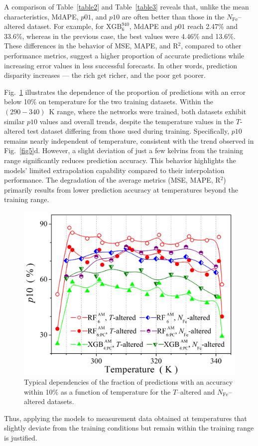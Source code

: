 \documentclass[a4paper,fleqn,draft]{cas-sc}
\begin{document}
A comparison of Table~\ref{table2} and Table~\ref{table3} reveals that,
unlike the mean characteristics, MdAPE, $p01$, and $p10$ are often better than those in the $N_\mathrm{Fe}$--altered dataset.
For example, for $\mathrm{XGB}^{940}_{6}$, MdAPE and $p01$ reach 2.47\% and 33.6\%,
whereas in the previous case, the best values were 4.46\% and 13.6\%.
These differences in the behavior of MSE, MAPE, and R$^2$, compared to other performance metrics,
suggest a higher proportion of accurate predictions while increasing error values in less successful forecasts.
In other words, prediction disparity increases ---
the rich get richer, and the poor get poorer.

Fig.~\ref{fig10} illustrates the dependence of the proportion of predictions with an error below 10\% on temperature for the two training datasets.
Within the $(290-340)$~K range, where the networks were trained, both datasets exhibit similar $p10$ values and overall trends,
despite the temperature values in the $T$-altered test dataset differing from those used during training.
Specifically, $p10$ remains nearly independent of temperature, consistent with the trend observed in Fig.~\ref{fig5}d.
However, a slight deviation of just a few kelvins from the training range significantly reduces prediction accuracy.
This behavior highlights the models' limited extrapolation capability compared to their interpolation performance.
The degradation of the average metrics (MSE, MAPE, R$^2$) primarily results from lower prediction accuracy at temperatures beyond the training range.

\begin{figure}
  \centering
     \includegraphics[width=0.5\linewidth]{Fig10.png}
    \caption{Typical dependencies of the fraction of predictions with an accuracy within 10\%
    as a function of temperature for the $T$--altered and $N_\mathrm{Fe}$--altered datasets.
}\label{fig10}
\end{figure}

Thus, applying the models to measurement data obtained at temperatures
that slightly deviate from the training conditions but remain within the training range is justified.
\end{document}
